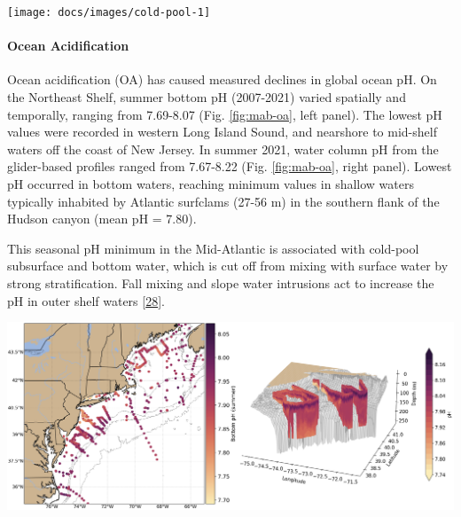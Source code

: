 \documentclass[
  10pt,
]{article}
\let\origfigure\figure
\let\endorigfigure\endfigure
\renewenvironment{figure}[1][2] {
    \expandafter\origfigure\expandafter[H]
} {
    \endorigfigure
}
\begin{document}
\begin{figure}

{\centering \texttt{[image: docs/images/cold-pool-1]} 

}

\caption{Cold pool index: Temperature, persistence, and spatial extent}\label{fig:cold-pool}
\end{figure}

\hypertarget{ocean-acidification}{%
\paragraph{Ocean Acidification}\label{ocean-acidification}}

Ocean acidification (OA) has caused measured declines in global ocean
pH. On the Northeast Shelf, summer bottom pH (2007-2021) varied
spatially and temporally, ranging from 7.69-8.07 (Fig. \ref{fig:mab-oa},
left panel). The lowest pH values were recorded in western Long Island
Sound, and nearshore to mid-shelf waters off the coast of New Jersey. In
summer 2021, water column pH from the glider-based profiles ranged from
7.67-8.22 (Fig. \ref{fig:mab-oa}, right panel). Lowest pH occurred in
bottom waters, reaching minimum values in shallow waters typically
inhabited by Atlantic surfclams (27-56 m) in the southern flank of the
Hudson canyon (mean pH = 7.80).

This seasonal pH minimum in the Mid-Atlantic is associated with
cold-pool subsurface and bottom water, which is cut off from mixing with
surface water by strong stratification. Fall mixing and slope water
intrusions act to increase the pH in outer shelf waters
{[}\protect\hyperlink{ref-wrightfairbanks_autonomous_2020}{28}{]}.

\begin{figure}

{\centering \includegraphics[width=0.8\linewidth]{images/Saba_Fig_SOE_MAFMC - Grace Saba} 

}

\caption{Left: Summer bottom pH collated from all quality-controlled vessel- and glider-based measurements from 2007-2021 Right: Glider-based pH profiles collected during summer 2021 in the Mid-Atlantic}\label{fig:mab-oa}
\end{figure}
\end{document}
